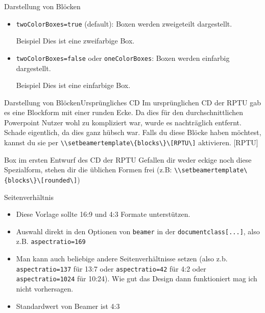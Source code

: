 \documentclass[german,10pt,compress]{beamer}
\begin{document}
\begin{frame}{Darstellung von Blöcken}
	\begin{itemize}
		\item \lstinline!twoColorBoxes=true! (default): Boxen werden zweigeteilt dargestellt.
		      \begin{block}{Beispiel}
			      Dies ist eine zweifarbige Box.
		      \end{block}
		\item \lstinline!twoColorBoxes=false! oder \lstinline!oneColorBoxes!: Boxen werden einfarbig dargestellt.
		      \begin{block}{Beispiel}
			      Dies ist eine einfarbige Box.
		      \end{block}
	\end{itemize}\end{frame}
\begin{frame}{Darstellung von Blöcken}{Ursprüngliches CD}
	Im ursprünglichen CD der RPTU gab es eine Blockform mit einer runden Ecke. Da dies für den durchschnittlichen Powerpoint Nutzer wohl zu kompliziert war, wurde es nachträglich entfernt. Schade eigentlich, da dies ganz hübsch war. Falls du diese Blöcke haben möchtest, kannst du sie per \lstinline!\\setbeamertemplate\{blocks\}\[RPTU\]! aktivieren.
	[RPTU]
	\begin{block}{Box im ersten Entwurf des CD der RPTU}
		Gefallen dir weder eckige noch diese Spezialform, stehen dir die üblichen Formen frei (z.B: \lstinline!\\setbeamertemplate\{blocks\}\[rounded\]!)
	\end{block}
\end{frame}
\begin{frame}{Seitenverhältnis}
	\begin{itemize}
		\item Diese Vorlage sollte 16:9 und 4:3 Formate unterstützen.
		\item Auswahl direkt in den Optionen von \lstinline!beamer! in der \lstinline!documentclass[...]!, also z.B. \lstinline!aspectratio=169!
		\item Man kann auch beliebige andere Seitenverhältnisse setzen (also z.b. \lstinline!aspectratio=137! für 13:7 oder \lstinline!aspectratio=42! für 4:2 oder \lstinline!aspectratio=1024! für 10:24). Wie gut das Design dann funktioniert mag ich nicht vorhersagen.
		\item Standardwert von Beamer ist 4:3
	\end{itemize}
\end{frame}
\end{document}
